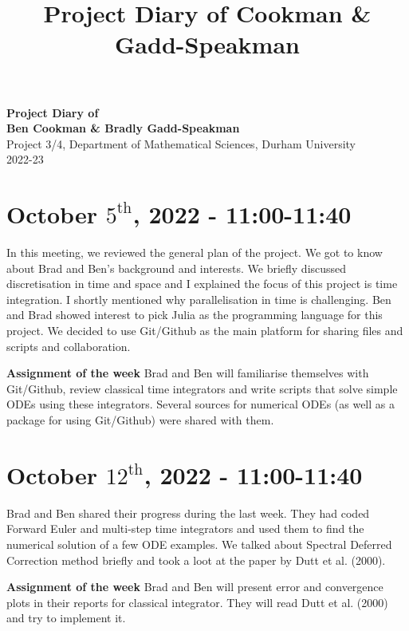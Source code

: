 \documentclass[11pt]{article}
\theoremstyle{definition}
\begin{document}
\setcounter{section}{0}
\title{Project Diary of Cookman \& Gadd-Speakman}

\thispagestyle{empty}

\begin{center}
{\LARGE \bf Project Diary of \\
Ben Cookman \& Bradly Gadd-Speakman}\\
{\Large Project 3/4, Department of Mathematical Sciences, Durham University}\\
{\Large 2022-23}
\end{center}
\section{October $5^{\text{th}}$, 2022 - 11:00-11:40}
In this meeting, we reviewed the general plan of the project. We got to know about Brad and Ben's background and interests. We briefly discussed discretisation in time and space and I explained the focus of this project is time integration. I shortly mentioned why parallelisation in time is challenging. Ben and Brad showed interest to pick Julia as the programming language for this project. We decided to use Git/Github as the main platform for sharing files and scripts and collaboration. 
\begin{shaded}
\textbf{Assignment of the week} \newline
Brad and Ben will familiarise themselves with Git/Github, review classical time integrators and write scripts that solve simple ODEs using these integrators. Several sources for numerical ODEs (as well as a package for using Git/Github) were shared with them.
\end{shaded}

\section{October $12^{\text{th}}$, 2022 - 11:00-11:40}

Brad and Ben shared their progress during the last week. They had coded Forward Euler and multi-step time integrators and used them to find the numerical solution of a few ODE examples. We talked about Spectral Deferred Correction method briefly and took a loot at the paper by Dutt et al. (2000). 
\begin{shaded}
\textbf{Assignment of the week} \newline
Brad and Ben will present error and convergence plots in their reports for classical integrator. They will read Dutt et al. (2000) and try to implement it. 
\end{shaded}
\end{document}
